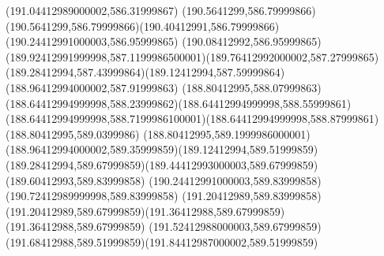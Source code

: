 {{	\lineto(191.04412989000002,586.31999867)
	\lineto(190.5641299,586.79999866)
	\curveto(190.5641299,586.79999866)(190.40412991,586.79999866)(190.24412991000003,586.95999865)
	\curveto(190.08412992,586.95999865)(189.92412991999998,587.1199986500001)(189.76412992000002,587.27999865)
	\curveto(189.28412994,587.43999864)(189.12412994,587.59999864)(188.96412994000002,587.91999863)
	\curveto(188.80412995,588.07999863)(188.64412994999998,588.23999862)(188.64412994999998,588.55999861)
	\curveto(188.64412994999998,588.7199986100001)(188.64412994999998,588.87999861)(188.80412995,589.0399986)
	\curveto(188.80412995,589.1999986000001)(188.96412994000002,589.35999859)(189.12412994,589.51999859)
	\curveto(189.28412994,589.67999859)(189.44412993000003,589.67999859)(189.60412993,589.83999858)
	\lineto(190.24412991000003,589.83999858)
	\lineto(190.72412989999998,589.83999858)
	\lineto(191.20412989,589.83999858)
	\curveto(191.20412989,589.67999859)(191.36412988,589.67999859)(191.36412988,589.67999859)
	\curveto(191.52412988000003,589.67999859)(191.68412988,589.51999859)(191.84412987000002,589.51999859)
	\closepath
}
}
{
}
{
}
